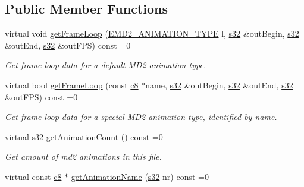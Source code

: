 \subsection*{Public Member Functions}
\begin{DoxyCompactItemize}
\item 
virtual void \hyperlink{classirr_1_1scene_1_1IAnimatedMeshMD2_a0bab7f9b11fd11f1fa8f2cd6e085b596}{get\+Frame\+Loop} (\hyperlink{namespaceirr_1_1scene_a08d4a84966e1d2886d0d57e4acbb4f19}{E\+M\+D2\+\_\+\+A\+N\+I\+M\+A\+T\+I\+O\+N\+\_\+\+T\+Y\+PE} l, \hyperlink{namespaceirr_ac66849b7a6ed16e30ebede579f9b47c6}{s32} \&out\+Begin, \hyperlink{namespaceirr_ac66849b7a6ed16e30ebede579f9b47c6}{s32} \&out\+End, \hyperlink{namespaceirr_ac66849b7a6ed16e30ebede579f9b47c6}{s32} \&out\+F\+PS) const =0
\begin{DoxyCompactList}\small\item\em Get frame loop data for a default M\+D2 animation type. \end{DoxyCompactList}\item 
virtual bool \hyperlink{classirr_1_1scene_1_1IAnimatedMeshMD2_a4d52cae663c479d88296561ec961410a}{get\+Frame\+Loop} (const \hyperlink{namespaceirr_a9395eaea339bcb546b319e9c96bf7410}{c8} $\ast$name, \hyperlink{namespaceirr_ac66849b7a6ed16e30ebede579f9b47c6}{s32} \&out\+Begin, \hyperlink{namespaceirr_ac66849b7a6ed16e30ebede579f9b47c6}{s32} \&out\+End, \hyperlink{namespaceirr_ac66849b7a6ed16e30ebede579f9b47c6}{s32} \&out\+F\+PS) const =0
\begin{DoxyCompactList}\small\item\em Get frame loop data for a special M\+D2 animation type, identified by name. \end{DoxyCompactList}\item 
\mbox{\label{classirr_1_1scene_1_1IAnimatedMeshMD2_abb4479ea266ea54230bf21c36319b323}} 
virtual \hyperlink{namespaceirr_ac66849b7a6ed16e30ebede579f9b47c6}{s32} \hyperlink{classirr_1_1scene_1_1IAnimatedMeshMD2_abb4479ea266ea54230bf21c36319b323}{get\+Animation\+Count} () const =0
\begin{DoxyCompactList}\small\item\em Get amount of md2 animations in this file. \end{DoxyCompactList}\item 
virtual const \hyperlink{namespaceirr_a9395eaea339bcb546b319e9c96bf7410}{c8} $\ast$ \hyperlink{classirr_1_1scene_1_1IAnimatedMeshMD2_aa619158d0fc11ea1032d838abf3566ca}{get\+Animation\+Name} (\hyperlink{namespaceirr_ac66849b7a6ed16e30ebede579f9b47c6}{s32} nr) const =0

\end{DoxyCompactItemize}
